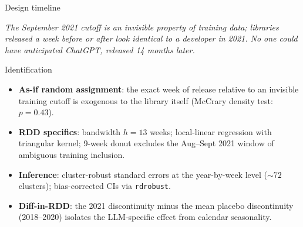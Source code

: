 \documentclass[10pt, aspectratio=169]{beamer}
\begin{document}
\begin{frame}{Design timeline}
    \centering
    \vfill
    \footnotesize \emph{The September 2021 cutoff is an invisible property of training data; libraries released a week before or after look identical to a developer in 2021. No one could have anticipated ChatGPT, released 14 months later.}
\end{frame}

\begin{frame}{Identification}
    \begin{itemize}
        \item \textbf{As-if random assignment}: the exact week of release relative to an invisible training cutoff is exogenous to the library itself (McCrary density test: $p = 0.43$).
        \item \textbf{RDD specifics}: bandwidth $h = 13$ weeks; local-linear regression with triangular kernel; 9-week donut excludes the Aug--Sept 2021 window of ambiguous training inclusion.
        \item \textbf{Inference}: cluster-robust standard errors at the year-by-week level (${\sim}72$ clusters); bias-corrected CIs via \texttt{rdrobust}.
        \item \textbf{Diff-in-RDD}: the 2021 discontinuity minus the mean placebo discontinuity (2018--2020) isolates the LLM-specific effect from calendar seasonality.
    \end{itemize}
\end{frame}
\end{document}
